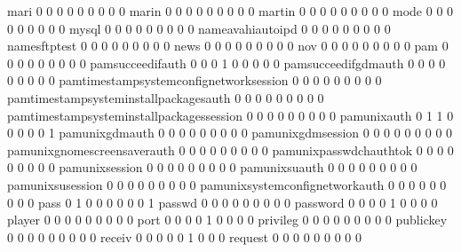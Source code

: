 \documentclass[compress,8pt]{beamer}
\begin{document}
\begin{frame}
\begin{Schunk}
  mari                                       0   0   0   0   0   0   0   0   0
  marin                                      0   0   0   0   0   0   0   0   0
  martin                                     0   0   0   0   0   0   0   0   0
  mode                                       0   0   0   0   0   0   0   0   0
  mysql                                      0   0   0   0   0   0   0   0   0
  nameavahiautoipd                           0   0   0   0   0   0   0   0   0
  namesftptest                               0   0   0   0   0   0   0   0   0
  news                                       0   0   0   0   0   0   0   0   0
  nov                                        0   0   0   0   0   0   0   0   0
  pam                                        0   0   0   0   0   0   0   0   0
  pamsucceedifauth                           0   0   0   1   0   0   0   0   0
  pamsucceedifgdmauth                        0   0   0   0   0   0   0   0   0
  pamtimestampsystemconfignetworksession     0   0   0   0   0   0   0   0   0
  pamtimestampsysteminstallpackagesauth      0   0   0   0   0   0   0   0   0
  pamtimestampsysteminstallpackagessession   0   0   0   0   0   0   0   0   0
  pamunixauth                                0   1   1   0   0   0   0   0   1
  pamunixgdmauth                             0   0   0   0   0   0   0   0   0
  pamunixgdmsession                          0   0   0   0   0   0   0   0   0
  pamunixgnomescreensaverauth                0   0   0   0   0   0   0   0   0
  pamunixpasswdchauthtok                     0   0   0   0   0   0   0   0   0
  pamunixsession                             0   0   0   0   0   0   0   0   0
  pamunixsuauth                              0   0   0   0   0   0   0   0   0
  pamunixsusession                           0   0   0   0   0   0   0   0   0
  pamunixsystemconfignetworkauth             0   0   0   0   0   0   0   0   0
  pass                                       0   1   0   0   0   0   0   0   1
  passwd                                     0   0   0   0   0   0   0   0   0
  password                                   0   0   0   0   1   0   0   0   0
  player                                     0   0   0   0   0   0   0   0   0
  port                                       0   0   0   0   1   0   0   0   0
  privileg                                   0   0   0   0   0   0   0   0   0
  publickey                                  0   0   0   0   0   0   0   0   0
  receiv                                     0   0   0   0   0   1   0   0   0
  request                                    0   0   0   0   0   0   0   0   0

\end{Schunk}
\end{frame}
\end{document}
